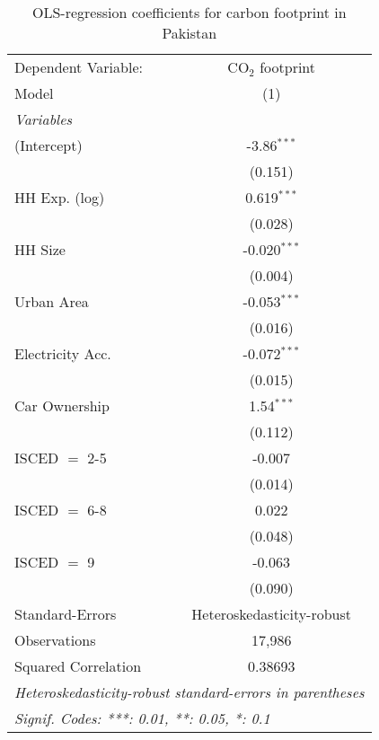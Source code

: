
\begin{table}[htbp!]
   \centering
   \small
   \begin{adjustbox}{width = 1\textwidth, max height = 0.95\textheight, center}
      \begin{threeparttable}[b]
         \caption{\label{tab:OLS_2_PAK} OLS-regression coefficients for carbon footprint in Pakistan}
         \begin{tabular}{lc}
            \tabularnewline \midrule \midrule
            Dependent Variable: & CO$_{2}$ footprint\\  
            Model               & (1)\\  
            \midrule
            \emph{Variables}\\
            (Intercept)         & -3.86$^{***}$\\   
                                & (0.151)\\   
            HH Exp. (log)       & 0.619$^{***}$\\   
                                & (0.028)\\   
            HH Size             & -0.020$^{***}$\\   
                                & (0.004)\\   
            Urban Area          & -0.053$^{***}$\\   
                                & (0.016)\\   
            Electricity Acc.    & -0.072$^{***}$\\   
                                & (0.015)\\   
            Car Ownership       & 1.54$^{***}$\\   
                                & (0.112)\\   
            ISCED $=$ 2-5       & -0.007\\   
                                & (0.014)\\   
            ISCED $=$ 6-8       & 0.022\\   
                                & (0.048)\\   
            ISCED $=$ 9         & -0.063\\   
                                & (0.090)\\   
            \midrule 
            Standard-Errors     & Heteroskedasticity-robust \\   
            Observations        & 17,986\\  
            Squared Correlation & 0.38693\\  
            \midrule \midrule
            \multicolumn{2}{l}{\emph{Heteroskedasticity-robust standard-errors in parentheses}}\\
            \multicolumn{2}{l}{\emph{Signif. Codes: ***: 0.01, **: 0.05, *: 0.1}}\\
         \end{tabular}
         

\end{threeparttable}
\end{adjustbox}
\end{table}
